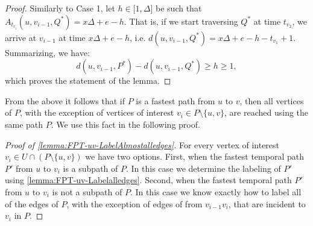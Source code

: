 \documentclass[a4paper,UKenglish,cleveref, autoref, thm-restate]{lipics-v2021}
\begin{document}
\begin{proof}
		Similarly to Case 1, let $h\in \lbrack 1,\Delta ]$ be such that $%
		A_{t_{v_{i}}}(u,v_{i-1},Q^{\ast })=x\Delta +e-h$. That is, if we start
		traversing $Q^{\ast }$ at time $t_{v_{2}}$, we arrive at $v_{i-1}$ at time $%
		x\Delta +e-h$, i.e. $d(u,v_{i-1},Q^{\ast })=x\Delta +e-h-t_{v_{1}}+1$.
		Summarizing, we have:%
		\begin{equation*}
			d(u,v_{i-1},P^{\ast })-d(u,v_{i-1},Q^{\ast })\geq h\geq 1,
		\end{equation*}%
		which proves the statement of the lemma.
	\end{proof}

 From the above it follows that if $P$ is a fastest path from $u$ to $v$,
 then all vertices of $P$, with the exception of vertices of interest $v_i \in P\setminus \{u,v\}$,
 are reached using the same path $P$.
 We use this fact in the following proof.

\begin{proof}[Proof of \cref{lemma:FPT-uv-LabelAlmostalledges}]
For every vertex of interest $v_i \in U \cap (P \setminus \{u,v\})$
we have two options.
First, when the fastest temporal path $P'$ from $u$ to $v_i$ is
a subpath of $P$.
In this case we determine the labeling of $P'$ using \cref{lemma:FPT-uv-Labelalledges}.
Second, when the fastest temporal path $P'$ from $u$ to $v_i$ is 
not a subpath of $P$. 
In this case we know exactly how to label all of the edges of $P$,
with the exception of edges of from $v_{i-1}v_i$, that are incident to $v_i$ in $P$.
\end{proof}
\end{document}
